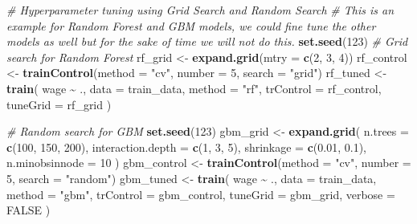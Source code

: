 \documentclass[
]{article}
\newenvironment{Shaded}{\begin{snugshade}}{\end{snugshade}}
\newcommand{\AttributeTok}[1]{\textcolor[rgb]{0.13,0.29,0.53}{#1}}
\newcommand{\CommentTok}[1]{\textcolor[rgb]{0.56,0.35,0.01}{\textit{#1}}}
\newcommand{\ConstantTok}[1]{\textcolor[rgb]{0.56,0.35,0.01}{#1}}
\newcommand{\DecValTok}[1]{\textcolor[rgb]{0.00,0.00,0.81}{#1}}
\newcommand{\FloatTok}[1]{\textcolor[rgb]{0.00,0.00,0.81}{#1}}
\newcommand{\FunctionTok}[1]{\textcolor[rgb]{0.13,0.29,0.53}{\textbf{#1}}}
\newcommand{\NormalTok}[1]{#1}
\newcommand{\OtherTok}[1]{\textcolor[rgb]{0.56,0.35,0.01}{#1}}
\newcommand{\SpecialCharTok}[1]{\textcolor[rgb]{0.81,0.36,0.00}{\textbf{#1}}}
\newcommand{\StringTok}[1]{\textcolor[rgb]{0.31,0.60,0.02}{#1}}
\begin{document}
\begin{Shaded}
\begin{Highlighting}[]
\CommentTok{\# Hyperparameter tuning using Grid Search and Random Search}
\CommentTok{\# This is an example for Random Forest and GBM models, we could fine tune the other models as well but for the sake of time we will not do this.}
\FunctionTok{set.seed}\NormalTok{(}\DecValTok{123}\NormalTok{)}
\CommentTok{\# Grid search for Random Forest}
\NormalTok{rf\_grid }\OtherTok{\textless{}{-}} \FunctionTok{expand.grid}\NormalTok{(}\AttributeTok{mtry =} \FunctionTok{c}\NormalTok{(}\DecValTok{2}\NormalTok{, }\DecValTok{3}\NormalTok{, }\DecValTok{4}\NormalTok{))}
\NormalTok{rf\_control }\OtherTok{\textless{}{-}} \FunctionTok{trainControl}\NormalTok{(}\AttributeTok{method =} \StringTok{"cv"}\NormalTok{, }\AttributeTok{number =} \DecValTok{5}\NormalTok{, }\AttributeTok{search =} \StringTok{"grid"}\NormalTok{)}
\NormalTok{rf\_tuned }\OtherTok{\textless{}{-}} \FunctionTok{train}\NormalTok{(}
\NormalTok{  wage }\SpecialCharTok{\textasciitilde{}}\NormalTok{ .,}
  \AttributeTok{data =}\NormalTok{ train\_data, }\AttributeTok{method =} \StringTok{"rf"}\NormalTok{,}
  \AttributeTok{trControl =}\NormalTok{ rf\_control, }\AttributeTok{tuneGrid =}\NormalTok{ rf\_grid}
\NormalTok{)}

\CommentTok{\# Random search for GBM}
\FunctionTok{set.seed}\NormalTok{(}\DecValTok{123}\NormalTok{)}
\NormalTok{gbm\_grid }\OtherTok{\textless{}{-}} \FunctionTok{expand.grid}\NormalTok{(}
  \AttributeTok{n.trees =} \FunctionTok{c}\NormalTok{(}\DecValTok{100}\NormalTok{, }\DecValTok{150}\NormalTok{, }\DecValTok{200}\NormalTok{),}
  \AttributeTok{interaction.depth =} \FunctionTok{c}\NormalTok{(}\DecValTok{1}\NormalTok{, }\DecValTok{3}\NormalTok{, }\DecValTok{5}\NormalTok{),}
  \AttributeTok{shrinkage =} \FunctionTok{c}\NormalTok{(}\FloatTok{0.01}\NormalTok{, }\FloatTok{0.1}\NormalTok{),}
  \AttributeTok{n.minobsinnode =} \DecValTok{10}
\NormalTok{)}
\NormalTok{gbm\_control }\OtherTok{\textless{}{-}} \FunctionTok{trainControl}\NormalTok{(}\AttributeTok{method =} \StringTok{"cv"}\NormalTok{, }\AttributeTok{number =} \DecValTok{5}\NormalTok{, }\AttributeTok{search =} \StringTok{"random"}\NormalTok{)}
\NormalTok{gbm\_tuned }\OtherTok{\textless{}{-}} \FunctionTok{train}\NormalTok{(}
\NormalTok{  wage }\SpecialCharTok{\textasciitilde{}}\NormalTok{ .,}
  \AttributeTok{data =}\NormalTok{ train\_data, }\AttributeTok{method =} \StringTok{"gbm"}\NormalTok{,}
  \AttributeTok{trControl =}\NormalTok{ gbm\_control, }\AttributeTok{tuneGrid =}\NormalTok{ gbm\_grid, }\AttributeTok{verbose =} \ConstantTok{FALSE}
\NormalTok{)}
\end{Highlighting}
\end{Shaded}
\end{document}
